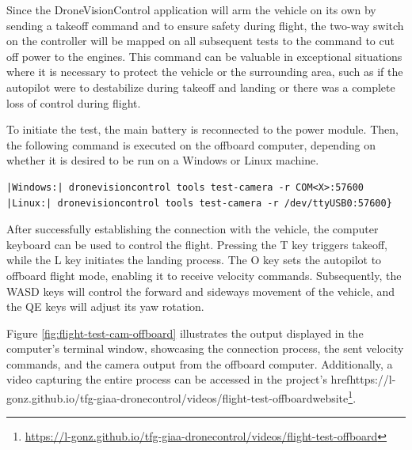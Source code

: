 Since the DroneVisionControl application will arm the vehicle on its own by sending a takeoff command and to ensure safety during flight, the two-way switch on the controller will be mapped on all subsequent tests to the command to cut off power to the engines. This command can be valuable in exceptional situations where it is necessary to protect the vehicle or the surrounding area, such as if the autopilot were to destabilize during takeoff and landing or there was a complete loss of control during flight.

To initiate the test, the main battery is reconnected to the power module. Then, the following command is executed on the offboard computer, depending on whether it is desired to be run on a Windows or Linux machine.


\begin{verbatim}
|Windows:| dronevisioncontrol tools test-camera -r COM<X>:57600
|Linux:| dronevisioncontrol tools test-camera -r /dev/ttyUSB0:57600}
\end{verbatim}


After successfully establishing the connection with the vehicle, the computer keyboard can be used to control the flight. Pressing the T key triggers takeoff, while the L key initiates the landing process. The O key sets the autopilot to offboard flight mode, enabling it to receive velocity commands. Subsequently, the WASD keys will control the forward and sideways movement of the vehicle, and the QE keys will adjust its yaw rotation.

Figure \ref{fig:flight-test-cam-offboard} illustrates the output displayed in the computer's terminal window, showcasing the connection process, the sent velocity commands, and the camera output from the offboard computer. Additionally, a video capturing the entire process can be accessed in the project's href{https://l-gonz.github.io/tfg-giaa-dronecontrol/videos/flight-test-offboard}{website}\footnote{\url{https://l-gonz.github.io/tfg-giaa-dronecontrol/videos/flight-test-offboard}}.

